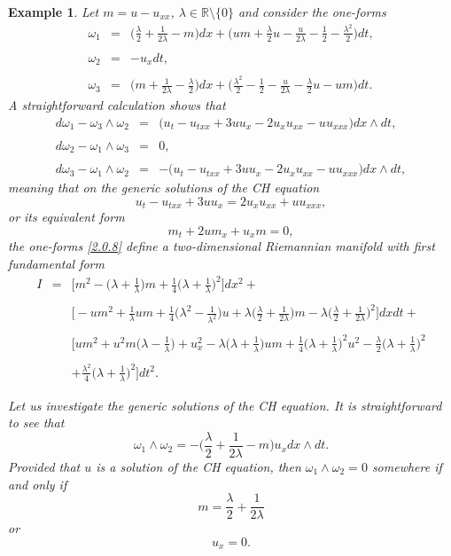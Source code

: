 \documentclass[10pt,a4paper]{amsart}
\newtheorem{example}{Example}
\newcommand{\ba}{\begin{array}}
\newcommand{\bb}{\begin{equation}}
\newcommand{\ea}{\end{array}}
\newcommand{\ee}{\end{equation}}
\begin{document}
\begin{example}\label{ex2.2}
     Let $m=u-u_{xx}$, $\lambda\in\mathbb{R}\setminus\{0\}$ and consider the one-forms
\bb\label{2.0.8}
\ba{lcl}
\omega_1&=&{\Big(\frac{\lambda}{2}+\frac{1}{2\lambda}-m\Big)dx+\Big(um+\frac{\lambda}{2}u-\frac{u}{2\lambda}-\frac{1}{2}-\frac{\lambda^2}{2}\Big)dt},\\
\\
\omega_2&=&-u_xdt,\\
\\
\omega_3&=&{\Big(m+\frac{1}{2\lambda}-\frac{\lambda}{2}\Big)dx+\Big(\frac{\lambda^2}{2}-\frac{1}{2}-\frac{u}{2\lambda}-\frac{\lambda}{2}u-um\Big)dt}.
\ea
\ee
A straightforward calculation shows that
\bb\label{2.0.9}
\ba{lcl}
d\omega_1-\omega_3\wedge\omega_2&=&\Big(u_t-u_{txx}+3uu_x-2u_xu_{xx}-uu_{xxx}\Big)dx\wedge dt,\\
\\
d\omega_2-\omega_1\wedge\omega_3&=&0,\\
\\
d\omega_3-\omega_1\wedge\omega_2&=&-\Big(u_t-u_{txx}+3uu_x-2u_xu_{xx}-uu_{xxx}\Big)dx\wedge dt,
\ea
\ee
meaning that on the generic solutions of the CH equation 
   \bb\label{1.0.5}
    u_t-u_{txx}+3uu_x=2u_xu_{xx}+uu_{xxx},
    \ee
    or its equivalent form
    \bb\label{1.0.6}
    m_t+2um_x+u_xm=0,
    \ee
the one-forms \eqref{2.0.8} define a two-dimensional Riemannian manifold with first fundamental form
$$
\ba{lcl}
I&=&{\Big[m^2-\Big(\lambda+\frac{1}{\lambda}\Big)m+\frac{1}{4}\Big(\lambda+\frac{1}{\lambda}\Big)^2\Big]dx^2}+\\
\\
&&{\Big[-um^2+\frac{1}{\lambda}um+\frac{1}{4}\Big(\lambda^2-\frac{1}{\lambda^2}\Big)u+\lambda\Big(\frac{\lambda}{2}+\frac{1}{2\lambda}\Big)m-\lambda\Big(\frac{\lambda}{2}+\frac{1}{2\lambda}\Big)^2\Big]dxdt}+\\
\\
&&{\Big[um^2+u^2m\Big(\lambda-\frac{1}{\lambda}\Big)+u_x^2-\lambda\Big(\lambda+\frac{1}{\lambda}\Big)um+\frac{1}{4}\Big(\lambda+\frac{1}{\lambda}\Big)^2u^2-\frac{\lambda}{2}\Big(\lambda+\frac{1}{\lambda}\Big)^2}\\
\\
&&{+\frac{\lambda^2}{4}\Big(\lambda+\frac{1}{\lambda}\Big)^2\Big]dt^2}.
\ea
$$

Let us investigate the generic solutions of the CH equation. It is straightforward to see that
   $$
    \omega_1\wedge\omega_2=-\Big(\frac{\lambda}{2}+\frac{1}{2\lambda}-m\Big)u_x dx\wedge dt.
   $$
    Provided that $u$ is a solution of the CH equation, then $\omega_1\wedge\omega_2=0$ somewhere if and only if 
    \bb\label{2.0.10}
    m=\frac{\lambda}{2}+\frac{1}{2\lambda}
    \ee
    or
    \bb\label{2.0.11}
    u_x=0.
    \ee
\end{example}
\end{document}
